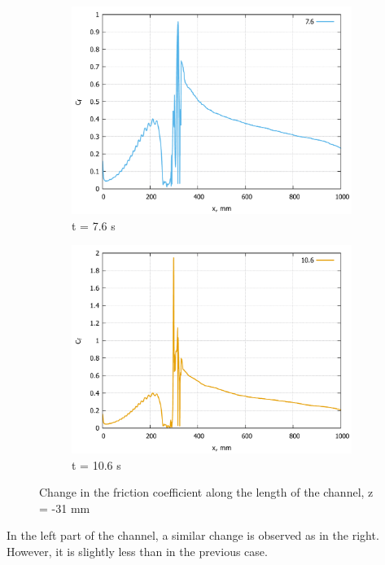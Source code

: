 \begin{figure}[H]
		\\
		\begin{subfigure}{.5\textwidth}
			\centering
			\includegraphics[width=1\linewidth]{../Assets/Cf-T760-31m}
			\caption{t = 7.6 s}
			\label{fig:Cf-T760-31m}
		\end{subfigure}%
		\begin{subfigure}{.5\textwidth}
			\centering
			\includegraphics[width=1\linewidth]{../Assets/Cf-T1060-31m}
			\caption{t = 10.6 s}
			\label{fig:Cf-T1060-31m}
		\end{subfigure}
		\caption{Change in the friction coefficient along the length of the channel, z = -31 mm}
		\label{fig:cf-31m}
	\end{figure}
	\newpage
	In the left part of the channel, a similar change is observed as in the right. However, it is slightly less than in the previous case.
